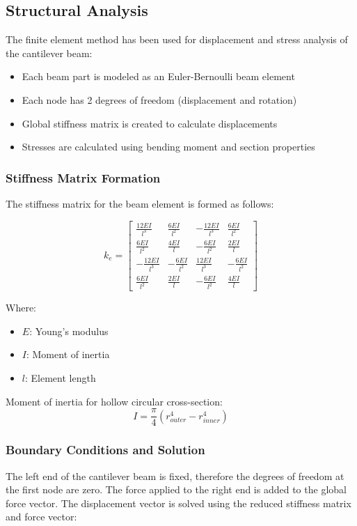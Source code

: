\subsection{Structural Analysis}
The finite element method has been used for displacement and stress analysis of the cantilever beam:

\begin{itemize}
    \item Each beam part is modeled as an Euler-Bernoulli beam element
    \item Each node has 2 degrees of freedom (displacement and rotation)
    \item Global stiffness matrix is created to calculate displacements
    \item Stresses are calculated using bending moment and section properties
\end{itemize}

\subsubsection{Stiffness Matrix Formation}
The stiffness matrix for the beam element is formed as follows:

\begin{equation}
k_e = \begin{bmatrix}
\frac{12EI}{l^3} & \frac{6EI}{l^2} & -\frac{12EI}{l^3} & \frac{6EI}{l^2} \\
\frac{6EI}{l^2} & \frac{4EI}{l} & -\frac{6EI}{l^2} & \frac{2EI}{l} \\
-\frac{12EI}{l^3} & -\frac{6EI}{l^2} & \frac{12EI}{l^3} & -\frac{6EI}{l^2} \\
\frac{6EI}{l^2} & \frac{2EI}{l} & -\frac{6EI}{l^2} & \frac{4EI}{l}
\end{bmatrix}
\end{equation}

Where:
\begin{itemize}
    \item $E$: Young's modulus
    \item $I$: Moment of inertia
    \item $l$: Element length
\end{itemize}

Moment of inertia for hollow circular cross-section:
\begin{equation}
I = \frac{\pi}{4}(r_{outer}^4 - r_{inner}^4)
\end{equation}

\subsubsection{Boundary Conditions and Solution}
The left end of the cantilever beam is fixed, therefore the degrees of freedom at the first node are zero. The force applied to the right end is added to the global force vector. The displacement vector is solved using the reduced stiffness matrix and force vector:

